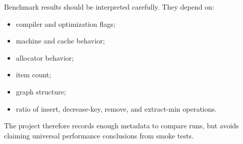 Benchmark results should be interpreted carefully.
They depend on:

\begin{itemize}
    \item compiler and optimization flags;
    \item machine and cache behavior;
    \item allocator behavior;
    \item item count;
    \item graph structure;
    \item ratio of insert, decrease-key, remove, and extract-min operations.
\end{itemize}

The project therefore records enough metadata to compare runs, but avoids claiming universal performance conclusions from smoke tests.
